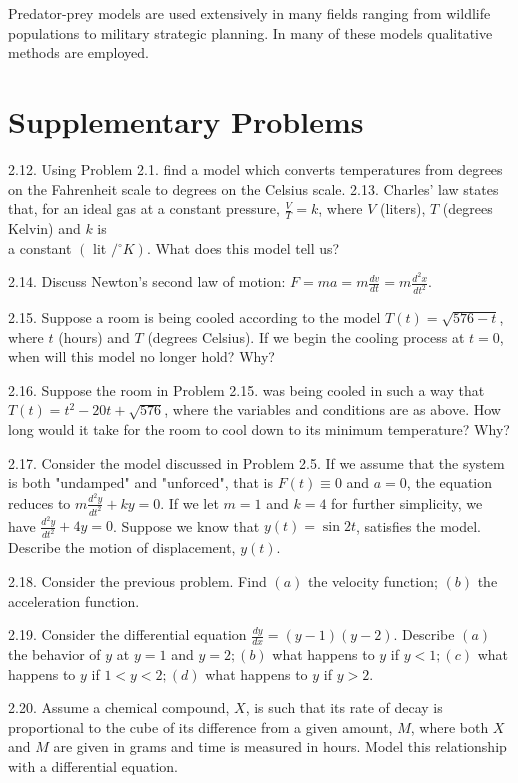 \documentclass[10pt]{article}
\begin{document}
Predator-prey models are used extensively in many fields ranging from wildlife populations to military strategic planning. In many of these models qualitative methods are employed.

\section*{Supplementary Problems}
2.12. Using Problem 2.1. find a model which converts temperatures from degrees on the Fahrenheit scale to degrees on the Celsius scale. 2.13. Charles' law states that, for an ideal gas at a constant pressure, $\frac{V}{T}=k$, where $V$ (liters), $T$ (degrees Kelvin) and $k$ is\\
a constant $\left(\right.$ lit $\left./{ }^{\circ} K\right)$. What does this model tell us?

2.14. Discuss Newton's second law of motion: $F=m a=m \frac{d v}{d t}=m \frac{d^{2} x}{d t^{2}}$.

2.15. Suppose a room is being cooled according to the model $T(t)=\sqrt{576-t}$, where $t$ (hours) and $T$ (degrees Celsius). If we begin the cooling process at $t=0$, when will this model no longer hold? Why?

2.16. Suppose the room in Problem 2.15. was being cooled in such a way that $T(t)=t^{2}-20 t+\sqrt{576}$, where the variables and conditions are as above. How long would it take for the room to cool down to its minimum temperature? Why?

2.17. Consider the model discussed in Problem 2.5. If we assume that the system is both "undamped" and "unforced", that is $F(t) \equiv 0$ and $a=0$, the equation reduces to $m \frac{d^{2} y}{d t^{2}}+k y=0$. If we let $m=1$ and $k=4$ for further simplicity, we have $\frac{d^{2} y}{d t^{2}}+4 y=0$. Suppose we know that $y(t)=\sin 2 t$, satisfies the model. Describe the motion of displacement, $y(t)$.

2.18. Consider the previous problem. Find $(a)$ the velocity function; $(b)$ the acceleration function.

2.19. Consider the differential equation $\frac{d y}{d x}=(y-1)(y-2)$. Describe $(a)$ the behavior of $y$ at $y=1$ and $y=2 ;(b)$ what happens to $y$ if $y<1 ;(c)$ what happens to $y$ if $1<y<2 ;(d)$ what happens to $y$ if $y>2$.

2.20. Assume a chemical compound, $X$, is such that its rate of decay is proportional to the cube of its difference from a given amount, $M$, where both $X$ and $M$ are given in grams and time is measured in hours. Model this relationship with a differential equation.
\end{document}
